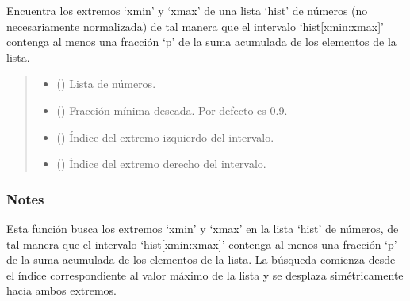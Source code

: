 \documentclass[letterpaper,10pt,english]{sphinxmanual}
\begin{document}
\begin{fulllineitems}
\label{\detokenize{utils.stats:utils.stats.get_area_fraction}}
\pysigstartsignatures
{}
\pysigstopsignatures
\sphinxAtStartPar
Encuentra los extremos ‘xmin’ y ‘xmax’ de una lista ‘hist’ de números (no necesariamente normalizada)
de tal manera que el intervalo ‘hist{[}xmin:xmax{]}’ contenga al menos una fracción ‘p’ de la suma acumulada
de los elementos de la lista.
\begin{quote}\begin{description}
\begin{itemize}
\item {} 
\sphinxAtStartPar
{} () \textendash{} Lista de números.

\item {} 
\sphinxAtStartPar
{} (\sphinxstyleliteralemphasis{\sphinxupquote{, }}) \textendash{} Fracción mínima deseada. Por defecto es 0.9.

\end{itemize}

\sphinxAtStartPar
\begin{itemize}
\item {} 
\sphinxAtStartPar
{} () \textendash{} Índice del extremo izquierdo del intervalo.

\item {} 
\sphinxAtStartPar
{} () \textendash{} Índice del extremo derecho del intervalo.

\end{itemize}


\end{description}\end{quote}
\subsubsection*{Notes}

\sphinxAtStartPar
Esta función busca los extremos ‘xmin’ y ‘xmax’ en la lista ‘hist’ de números, de tal manera que el intervalo
‘hist{[}xmin:xmax{]}’ contenga al menos una fracción ‘p’ de la suma acumulada de los elementos de la lista. La búsqueda
comienza desde el índice correspondiente al valor máximo de la lista y se desplaza simétricamente hacia ambos extremos.

\end{fulllineitems}
\end{document}
